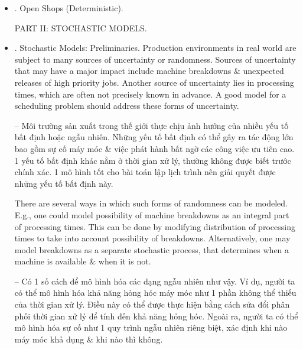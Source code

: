 \documentclass{article}
\newtheorem{example}{Example}
\begin{document}
\begin{itemize}
\begin{itemize}
\begin{example}[Application of branch \& bound]
            -- Xét trường hợp được mô tả trong Ví dụ 7.1.1. Đồ thị ban đầu chỉ chứa các cung liên hợp \& được mô tả trong {\sf Hình 7.3a: Đồ thị thứ tự ưu tiên ở Cấp độ 1 trong Ví dụ 7.1.4}. Makespan tương ứng với đồ thị này là 22. Áp dụng thủ tục branch-\&-bound cho trường hợp này sẽ cho ra cây branch-\&-bound sau.

            p. 194+++
        \end{example}

        \item {. Shifting Bottleneck Heuristic \& Makespan.}
    \end{itemize}

    \item {. Open Shops (Deterministic).}

    PART II: STOCHASTIC MODELS.
    \item {. Stochastic Models: Preliminaries.} Production environments in real world are subject to many sources of uncertainty or randomness. Sources of uncertainty that may have a major impact include machine breakdowns \& unexpected releases of high priority jobs. Another source of uncertainty lies in processing times, which are often not precisely known in advance. A good model for a scheduling problem should address these forms of uncertainty.

    -- Môi trường sản xuất trong thế giới thực chịu ảnh hưởng của nhiều yếu tố bất định hoặc ngẫu nhiên. Những yếu tố bất định có thể gây ra tác động lớn bao gồm sự cố máy móc \& việc phát hành bất ngờ các công việc ưu tiên cao. 1 yếu tố bất định khác nằm ở thời gian xử lý, thường không được biết trước chính xác. 1 mô hình tốt cho bài toán lập lịch trình nên giải quyết được những yếu tố bất định này.

    There are several ways in which such forms of randomness can be modeled. E.g., one could model possibility of machine breakdowns as an integral part of processing times. This can be done by modifying distribution of processing times to take into account possibility of breakdowns. Alternatively, one may model breakdowns as a separate stochastic process, that determines when a machine is available \& when it is not.

    -- Có 1 số cách để mô hình hóa các dạng ngẫu nhiên như vậy. Ví dụ, người ta có thể mô hình hóa khả năng hỏng hóc máy móc như 1 phần không thể thiếu của thời gian xử lý. Điều này có thể được thực hiện bằng cách sửa đổi phân phối thời gian xử lý để tính đến khả năng hỏng hóc. Ngoài ra, người ta có thể mô hình hóa sự cố như 1 quy trình ngẫu nhiên riêng biệt, xác định khi nào máy móc khả dụng \& khi nào thì không.


\end{itemize}
\end{document}

